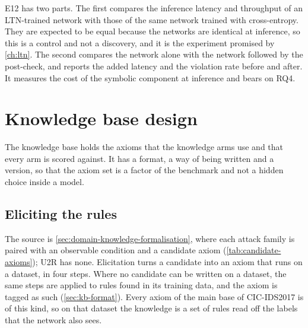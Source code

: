 E12 has two parts. The first compares the inference latency and throughput of an
LTN-trained network with those of the same network trained with cross-entropy. They
are expected to be equal because the networks are identical at inference, so this is
a control and not a discovery, and it is the experiment promised by \cref{ch:ltn}.
The second compares the network alone with the network followed by the post-check,
and reports the added latency and the violation rate before and after. It measures
the cost of the symbolic component at inference and bears on RQ4.

\section{Knowledge base design}
\label{sec:kb-design}

The knowledge base holds the axioms that the knowledge arms use and that every arm
is scored against. It has a format, a way of being written and a version, so that
the axiom set is a factor of the benchmark and not a hidden choice inside a model.

\subsection{Eliciting the rules}
\label{sec:kb-elicitation}

The source is \cref{sec:domain-knowledge-formalisation}, where each attack family is
paired with an observable condition and a candidate axiom
(\cref{tab:candidate-axioms}); U2R has none. Elicitation turns a candidate into an
axiom that runs on a dataset, in four steps. Where no candidate can be written on a
dataset, the same steps are applied to rules found in its training data, and the
axiom is tagged as such (\cref{sec:kb-format}). Every axiom of the main base of
CIC-IDS2017 is of this kind, so on that dataset the knowledge is a set of rules read
off the labels that the network also sees.

